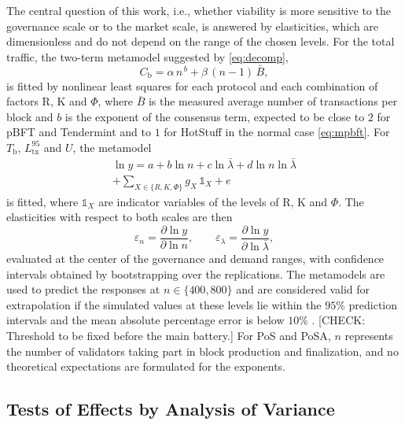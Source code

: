 \documentclass[english]{sbc2025}%
\newcommand{\chk}[1]{\textcolor{orange!80!black}{[CHECK: #1]}}
\newcommand{\Tb}{T_{\mathrm{b}}}
\newcommand{\Cb}{C_{\mathrm{b}}}
\newcommand{\Lt}{L^{95}_{\mathrm{tx}}}
\newcommand{\Ut}{U}
\begin{document}
The central question of this work, i.e., whether viability is more sensitive to the governance scale or to the market scale, is answered by elasticities, which are dimensionless and do not depend on the range of the chosen levels. For the total traffic, the two-term metamodel suggested by \eqref{eq:decomp},
\begin{equation}
\Cb = \alpha\, n^{\,b} + \beta\, (n-1)\, \bar{B},
\label{eq:cbmodel}
\end{equation}
is fitted by nonlinear least squares for each protocol and each combination of factors R, K and $\Phi$, where $\bar{B}$ is the measured average number of transactions per block and $b$ is the exponent of the consensus term, expected to be close to $2$ for pBFT and Tendermint and to $1$ for HotStuff in the normal case \eqref{eq:mpbft}. For $\Tb$, $\Lt$ and $\Ut$, the metamodel
\begin{multline}
\ln y = a + b \ln n + c \ln \bar{\lambda} + d \ln n \ln \bar{\lambda} \\
+ \textstyle\sum_{X \in \{R, K, \Phi\}} g_{X}\, \mathbb{1}_{X} + e
\label{eq:scaling}
\end{multline}
is fitted, where $\mathbb{1}_{X}$ are indicator variables of the levels of R, K and $\Phi$. The elasticities with respect to both scales are then
\begin{equation}
\varepsilon_{n} = \frac{\partial \ln y}{\partial \ln n}, \qquad \varepsilon_{\lambda} = \frac{\partial \ln y}{\partial \ln \bar{\lambda}},
\label{eq:elast}
\end{equation}
evaluated at the center of the governance and demand ranges, with confidence intervals obtained by bootstrapping over the replications. The metamodels are used to predict the responses at $n \in \{400, 800\}$ and are considered valid for extrapolation if the simulated values at these levels lie within the $95\%$ prediction intervals and the mean absolute percentage error is below $10\%$ \citep{Kleijnen2015}. \chk{Threshold to be fixed before the main battery.} For PoS and PoSA, $n$ represents the number of validators taking part in block production and finalization, and no theoretical expectations are formulated for the exponents.

\subsection{Tests of Effects by Analysis of Variance}
\end{document}
